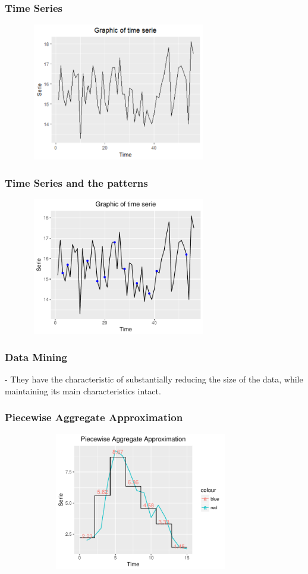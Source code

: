 \documentclass[10pt, compress]{beamer}
\begin{document}
\begin{frame}[fragile]
\frametitle{Time Series}

\begin{figure}
  \centering
   \includegraphics[width=8cm,height=6cm]{Rplot.pdf}
\end{figure}
\end{frame}

\begin{frame}[fragile]
\frametitle{Time Series and the patterns}

\begin{figure}
  \centering
   \includegraphics[width=8cm,height=6cm]{Rplot04.pdf}
\end{figure}
\end{frame}

\begin{frame}[fragile]
\frametitle{Data Mining}

- They have the characteristic of substantially reducing the size of the data, while maintaining its main characteristics intact.
\end{frame}

\begin{frame}[fragile]
\frametitle{Piecewise Aggregate Approximation}
\begin{figure}
  \centering
   \includegraphics[width=10cm,height=6cm]{PAA.pdf}
\end{figure}
\end{frame}
\end{document}
